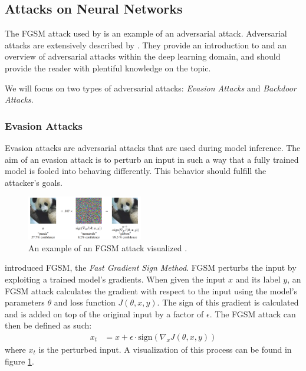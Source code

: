 \documentclass[11pt]{article}
\begin{document}
\subsection{Attacks on Neural Networks}
The FGSM attack used by \citet{shihao2024adversarial} is an example of an adversarial attack.
Adversarial attacks are extensively described by \citet{xiaoyong2019adversarial}.
They provide an introduction to and an overview of adversarial attacks within the deep learning domain, and should provide the reader with plentiful knowledge on the topic.

We will focus on two types of adversarial attacks: \textit{Evasion Attacks} and \textit{Backdoor Attacks}.

\subsubsection{Evasion Attacks}
Evasion attacks are adversarial attacks that are used during model inference.
The aim of an evasion attack is to perturb an input in such a way that a fully trained model is fooled into behaving differently.
This behavior should fulfill the attacker's goals.

\begin{figure}[h]
    \centering
    \includegraphics[width=0.45\textwidth]{fgsm.png}
    \caption{An example of an FGSM attack visualized \citep{goodfellow2015explaining}.}
    \label{fig:fgsm}
\end{figure}

\citet{goodfellow2015explaining} introduced FGSM, the \textit{Fast Gradient Sign Method}.
FGSM perturbs the input by exploiting a trained model's gradients.
When given the input $x$ and its label $y$, an FGSM attack calculates the gradient with respect to the input using the model's parameters $\theta$ and loss function $J(\theta, x, y)$.
The sign of this gradient is calculated and is added on top of the original input by a factor of $\epsilon$.
The FGSM attack can then be defined as such:
\begin{align*}
  x_t &= x + \epsilon \cdot \text{sign}(\nabla_x J(\theta, x, y))
\end{align*}
where $x_t$ is the perturbed input.
A visualization of this process can be found in figure \ref{fig:fgsm}.
\end{document}
